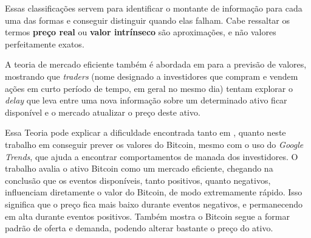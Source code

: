 Essas classificações servem para identificar o montante de informação para cada uma das formas e conseguir distinguir quando elas falham. Cabe ressaltar os termos \textbf{preço real} ou \textbf{valor intrínseco} são aproximações, e não valores perfeitamente exatos. 

A teoria de mercado eficiente também é abordada em \cite{timmermann2004efficient} para a previsão de valores, mostrando que \textit{traders} (nome designado a investidores que compram e vendem ações em curto período de tempo, em geral no mesmo dia) tentam explorar o \textit{delay} que leva entre uma nova informação sobre um determinado ativo ficar disponível e o mercado atualizar o preço deste ativo.

Essa Teoria pode explicar a dificuldade encontrada tanto em \cite{mcnally2016predicting}, quanto neste trabalho em conseguir prever os valores do Bitcoin, mesmo com o uso do \textit{Google Trends}, que ajuda a encontrar comportamentos de manada dos investidores. O trabalho \cite{bartos2015does} avalia o ativo Bitcoin como um mercado eficiente, chegando na conclusão que os eventos disponíveis, tanto positivos, quanto negativos, influenciam diretamente o valor do Bitcoin, de modo extremamente rápido. Isso significa que o preço fica mais baixo durante eventos negativos, e permanecendo em alta durante eventos positivos. Também mostra o Bitcoin segue a formar padrão de oferta e demanda, podendo alterar bastante o preço do ativo.